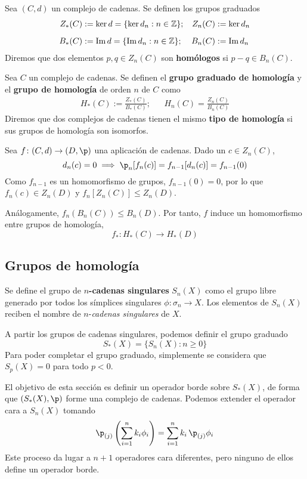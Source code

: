 Sea $(C,d)$ un complejo de cadenas. Se definen los grupos graduados
\begin{align*}
Z_*(C)&:=\ker d=\{\ker d_n: n \in \mathbb{Z}\};	& Z_n(C)&:=\ker d_n\\[0.2cm]
B_*(C)&:=\operatorname{Im} d=\{\operatorname{Im} d_n: n \in \mathbb{Z}\}; 	& B_n(C)&:=\operatorname{Im} d_n
\end{align*}
Diremos que dos elementos $p,q \in Z_n(C)$ son \textbf{homólogos} si
$p-q \in B_n(C)$.

\begin{definition}
Sea $C$ un complejo de cadenas. Se definen el \textbf{grupo graduado de
homología} y el \textbf{grupo de homología} de orden $n$ de $C$ como 
\begin{align*}
H_*(C):=\frac{Z_*(C)}{B_*(C)}; && H_n(C)=\frac{Z_n(C)}{B_n(C)}
\end{align*}
Diremos que dos complejos de cadenas tienen el mismo \textbf{tipo de homología}
si sus grupos de homología son isomorfos.
\end{definition}

Sea $f\colon (C,d) \to (D,\p)$ una aplicación de cadenas. Dado un
$c \in Z_n(C)$,
\[d_n(c)=0 \implies \p_n[f_n(c)]=f_{n-1}[d_n(c)]=f_{n-1}(0)\]
Como $f_{n-1}$ es un homomorfismo de grupos, $f_{n-1}(0)=0$, por lo que
$f_n(c)\in Z_n(D)$ y $f_n[Z_n(C)]\leq Z_n(D)$.

Análogamente, $f_n(B_n(C)) \leq B_n(D)$. Por tanto, $f$ induce un homomorfismo
entre grupos de homología,
\[f_*\colon H_*(C) \to H_*(D)\]

\subsection{Grupos de homología}
\begin{definition}
Se define el grupo de \textbf{$n$-cadenas
singulares} $S_n(X)$ como el grupo libre generado por todos los símplices
singulares $\phi\colon \sigma_n \to X$. Los elementos de $S_n(X)$
reciben el nombre de $n$-\emph{cadenas singulares} de $X$.
\end{definition}

A partir los grupos de cadenas singulares, podemos definir el grupo graduado
\[S_*(X)=\{S_n(X): n \geq 0\}\]
Para poder completar el grupo graduado, simplemente se considera que $S_p(X)=0$
para todo $p < 0$.

El objetivo de esta sección es definir un operador borde sobre $S_*(X)$, de
forma que $(S_*(X),\p)$ forme una complejo de cadenas. Podemos extender el
operador cara a $S_n(X)$ tomando
\[\p_{(j)}\left(\sum_{i=1}^n k_i\phi_i\right)= \sum^n_{i=1}k_i\,\p_{(j)}\phi_i\]
Este proceso da lugar a $n+1$ operadores cara diferentes, pero ninguno de ellos
define un operador borde.

